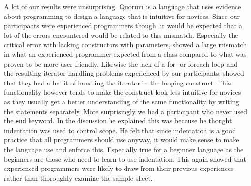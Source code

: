 A lot of our results were unsurprising.
Quorum is a language that uses evidence about programming to design a language that is intuitive for novices.
Since our participants were experienced programmers though, it would be expected that a lot of the errors encountered would be related to this mismatch.
Especially the critical error with lacking constructors with parameters, showed a large mismatch in what an experienced programmer expected from a class compared to what was proven to be more user-friendly\cite{ParamConstructors}.
Likewise the lack of a for- or foreach loop and the resulting iterator handling problems experienced by our participants, showed that they had a habit of handling the iterator in the looping construct.
This functionality however tends to make the construct look less intuitive for novices as they usually get a better understanding of the same functionality by writing the statements separately.
More surprisingly we had a participant who never used the \lstinline!end! keyword.
In the discussion he explained this was because he thought indentation was used to control scope.
He felt that since indentation is a good practice that all programmers should use anyway, it would make sense to make the language use and enforce this.
Especially true for a beginner language as the beginners are those who need to learn to use indentation.
This again showed that experienced programmers were likely to draw from their previous experiences rather than thoroughly examine the sample sheet.


